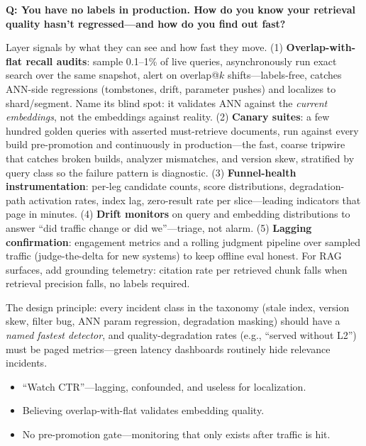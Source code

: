 \begin{interviewq}
\textbf{Q: You have no labels in production. How do you know your retrieval quality hasn't regressed---and how do you find out fast?}

 \quad {} \quad \badgefreq{\freqmed}

\stronganswer

Layer signals by what they can see and how fast they move. (1) \textbf{Overlap-with-flat recall audits}: sample 0.1--1\% of live queries, asynchronously run exact search over the same snapshot, alert on overlap@$k$ shifts---labels-free, catches ANN-side regressions (tombstones, drift, parameter pushes) and localizes to shard/segment. Name its blind spot: it validates ANN against the \textit{current embeddings}, not the embeddings against reality. (2) \textbf{Canary suites}: a few hundred golden queries with asserted must-retrieve documents, run against every build pre-promotion and continuously in production---the fast, coarse tripwire that catches broken builds, analyzer mismatches, and version skew, stratified by query class so the failure pattern is diagnostic. (3) \textbf{Funnel-health instrumentation}: per-leg candidate counts, score distributions, degradation-path activation rates, index lag, zero-result rate per slice---leading indicators that page in minutes. (4) \textbf{Drift monitors} on query and embedding distributions to answer ``did traffic change or did we''---triage, not alarm. (5) \textbf{Lagging confirmation}: engagement metrics and a rolling judgment pipeline over sampled traffic (judge-the-delta for new systems) to keep offline eval honest. For RAG surfaces, add grounding telemetry: citation rate per retrieved chunk falls when retrieval precision falls, no labels required.

The design principle: every incident class in the taxonomy (stale index, version skew, filter bug, ANN param regression, degradation masking) should have a \textit{named fastest detector}, and quality-degradation rates (e.g., ``served without L2'') must be paged metrics---green latency dashboards routinely hide relevance incidents.

\redflags
\begin{itemize}
    \item ``Watch CTR''---lagging, confounded, and useless for localization.
    \item Believing overlap-with-flat validates embedding quality.
    \item No pre-promotion gate---monitoring that only exists after traffic is hit.
\end{itemize}


\end{interviewq}
